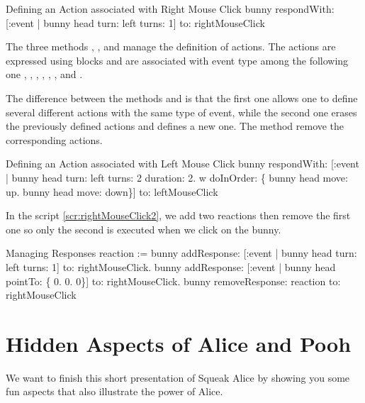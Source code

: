 \begin{scriptwithtitle}{Defining an Action associated with Right Mouse Click}\label{scr:rightMouseClick}
bunny respondWith: [:event | bunny head turn: left turns: 1] to: rightMouseClick
\end{scriptwithtitle}

The three methods , , and  manage the definition of actions. The actions are expressed using blocks and are associated with event type among the following one  , , , , , , and . 

The difference between the methods  and  is that the first one allows one to define several 
different actions with the same type of event, while the second one erases the previously defined actions and defines a new one. The method  remove the corresponding actions.

\begin{scriptwithtitle}{Defining an Action associated with Left Mouse Click}\label{scr:leftMouseClick}
bunny 
   respondWith: 
      [:event | 
         bunny head turn: left turns: 2 duration: 2.
         w doInOrder: \{ 
            bunny head move: up.
            bunny head move: down\}]
	to: leftMouseClick
\end{scriptwithtitle}

In the script \ref{scr:rightMouseClick2}, we add two reactions then remove the first one so only the second is executed when 
we click on the bunny. 

\begin{scriptwithtitle}{Managing Responses}\label{scr:rightMouseClick2}
reaction := bunny 
   addResponse:  [:event | bunny head turn: left turns: 1] 
   to: rightMouseClick.
bunny 
   addResponse: [:event | bunny head pointTo: \{ 0. 0. 0\}] 
   to: rightMouseClick.
bunny removeResponse: reaction to: rightMouseClick
\end{scriptwithtitle}









\section{Hidden Aspects of Alice and Pooh}
We want to finish this short presentation of Squeak Alice by showing you 
some fun aspects that also illustrate the power of Alice. 

